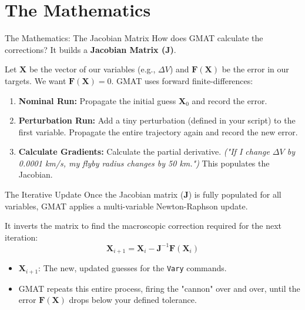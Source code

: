 \documentclass[11pt]{beamer}
\begin{document}
\section{The Mathematics}

\begin{frame}{The Mathematics: The Jacobian Matrix}
    How does GMAT calculate the corrections? It builds a \textbf{Jacobian Matrix ($\mathbf{J}$)}.
    
    \vspace{0.2cm}
    Let $\mathbf{X}$ be the vector of our variables (e.g., $\Delta V$) and $\mathbf{F}(\mathbf{X})$ be the error in our targets. We want $\mathbf{F}(\mathbf{X}) = 0$. GMAT uses forward finite-differences:
    
    \begin{enumerate}
        \item \textbf{Nominal Run:} Propagate the initial guess $\mathbf{X}_0$ and record the error.
        \item \textbf{Perturbation Run:} Add a tiny perturbation (defined in your script) to the first variable. Propagate the entire trajectory again and record the new error.
        \item \textbf{Calculate Gradients:} Calculate the partial derivative. \textit{("If I change $\Delta V$ by 0.0001 km/s, my flyby radius changes by 50 km.")} This populates the Jacobian.
    \end{enumerate}
\end{frame}

\begin{frame}{The Iterative Update}
    Once the Jacobian matrix ($\mathbf{J}$) is fully populated for all variables, GMAT applies a multi-variable Newton-Raphson update.
    
    \vspace{0.3cm}
    It inverts the matrix to find the macroscopic correction required for the next iteration:
    \begin{equation}
        \mathbf{X}_{i+1} = \mathbf{X}_i - \mathbf{J}^{-1} \mathbf{F}(\mathbf{X}_i)
    \end{equation}
    
    \vspace{0.3cm}
    \begin{itemize}
        \item $\mathbf{X}_{i+1}$: The new, updated guesses for the \texttt{Vary} commands.
        \item GMAT repeats this entire process, firing the "cannon" over and over, until the error $\mathbf{F}(\mathbf{X})$ drops below your defined tolerance.
    \end{itemize}
\end{frame}
\end{document}
